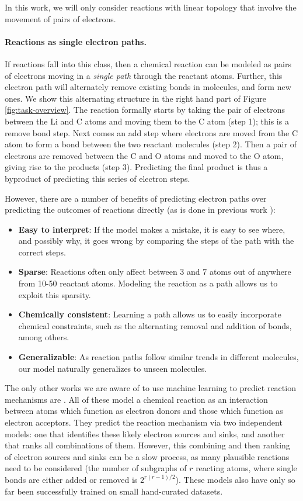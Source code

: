 In this work, we will only consider reactions with linear topology that involve the movement of pairs of electrons.


\vspace{-0.15cm}
\paragraph{Reactions as single electron paths.}
If reactions fall into this class, then a chemical reaction can be modeled as pairs of electrons moving in a \emph{single path} through the reactant atoms. 
Further, this electron path will alternately remove existing bonds in molecules, and form new ones. We show this alternating structure in the right hand part of Figure \ref{fig:task-overview}. 
The reaction formally starts by taking the pair of electrons between the Li and C atoms and moving them to the C atom (step 1); this is a remove bond step. 
Next comes an add step where electrons are moved from the C atom to form a bond between the two reactant molecules (step 2).
Then a pair of electrons are removed between the C and O atoms and moved to the O atom, giving rise to the products (step 3). 
Predicting the final product is thus a byproduct of predicting this series of electron steps.

However, there are a number of benefits of predicting electron paths over predicting the outcomes of reactions directly (as is done in previous work \cite{jin2017predicting,schwaller2017found}):
\begin{itemize}
\item \textbf{Easy to interpret}: If the model makes a mistake, it is easy to see where, and possibly why, it goes wrong by comparing the steps of the path with the correct steps.
\item \textbf{Sparse}: Reactions often only affect between 3 and 7 atoms out of anywhere from 10-50 reactant atoms. Modeling the reaction as a path allows us to exploit this sparsity.
\item \textbf{Chemically consistent}: Learning a path allows us to easily incorporate chemical constraints, such as the alternating removal and addition of bonds, among others. 
\item \textbf{Generalizable}: As reaction paths follow similar trends in different molecules, our model naturally generalizes to unseen molecules. 
\end{itemize}
The only other works we are aware of to use machine learning to predict reaction mechanisms are \cite{fooshee2018deep,kayala2012reactionpredictor,kayala2011learning, NIPS2011_4356}.
All of these model a chemical reaction as an interaction between atoms which function as electron donors and those which function as electron acceptors.
 They predict the reaction mechanism via two independent models: one that identifies these likely electron sources and sinks, and another that ranks all combinations of them.
However, this combining and then ranking of electron sources and sinks can be a slow process, as many plausible reactions need to be considered (the number of subgraphs of $r$ reacting atoms, where single bonds are either added or removed is $2^{r(r-1)/2}$).
These models also have only so far been successfully trained on small hand-curated datasets.

